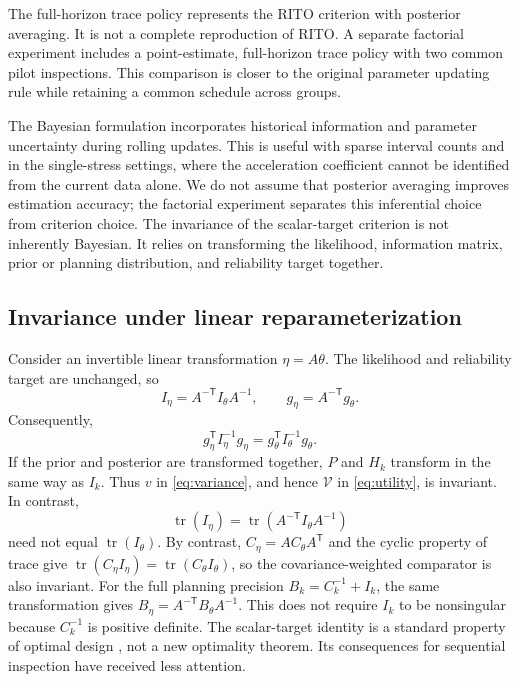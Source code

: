 \documentclass[a4paper,fleqn]{cas-sc}
\begin{document}
The full-horizon trace policy represents the RITO criterion with posterior averaging. It is not a complete reproduction of RITO. A separate factorial experiment includes a point-estimate, full-horizon trace policy with two common pilot inspections. This comparison is closer to the original parameter updating rule while retaining a common schedule across groups.

The Bayesian formulation incorporates historical information and parameter uncertainty during rolling updates. This is useful with sparse interval counts and in the single-stress settings, where the acceleration coefficient cannot be identified from the current data alone. We do not assume that posterior averaging improves estimation accuracy; the factorial experiment separates this inferential choice from criterion choice. The invariance of the scalar-target criterion is not inherently Bayesian. It relies on transforming the likelihood, information matrix, prior or planning distribution, and reliability target together.

\subsection{Invariance under linear reparameterization}

Consider an invertible linear transformation $\eta=A\theta$. The likelihood and reliability target are unchanged, so
\begin{equation}
I_{\eta}=A^{-\mathsf T}I_{\theta}A^{-1},\qquad
g_{\eta}=A^{-\mathsf T}g_{\theta}.
\label{eq:transform}
\end{equation}
Consequently,
\begin{equation}
g_{\eta}^{\mathsf T}I_{\eta}^{-1}g_{\eta}
=g_{\theta}^{\mathsf T}I_{\theta}^{-1}g_{\theta}.
\label{eq:invariance}
\end{equation}
If the prior and posterior are transformed together, $P$ and $H_k$ transform in the same way as $I_k$. Thus $v$ in \eqref{eq:variance}, and hence $\mathcal V$ in \eqref{eq:utility}, is invariant. In contrast,
\begin{equation}
\operatorname{tr}(I_{\eta})=\operatorname{tr}(A^{-\mathsf T}I_{\theta}A^{-1})
\end{equation}
need not equal $\operatorname{tr}(I_{\theta})$. By contrast, $C_{\eta}=AC_{\theta}A^{\mathsf T}$ and the cyclic property of trace give $\operatorname{tr}(C_{\eta}I_{\eta})=\operatorname{tr}(C_{\theta}I_{\theta})$, so the covariance-weighted comparator is also invariant. For the full planning precision $B_k=C_k^{-1}+I_k$, the same transformation gives $B_{\eta}=A^{-\mathsf T}B_{\theta}A^{-1}$. This does not require $I_k$ to be nonsingular because $C_k^{-1}$ is positive definite. The scalar-target identity is a standard property of optimal design \citep{silvey1980}, not a new optimality theorem. Its consequences for sequential inspection have received less attention.
\end{document}
